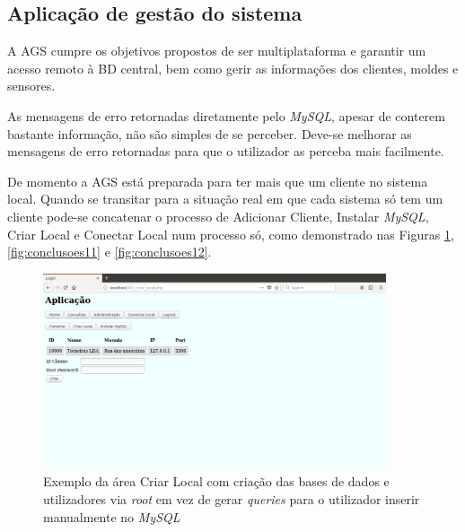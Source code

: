 \documentclass[11pt,twoside,a4paper]{report}
\begin{document}
\subsection{Aplicação de gestão do sistema}
A AGS cumpre os objetivos propostos de ser multiplataforma e garantir um acesso remoto à BD central, bem como gerir as informações dos clientes, moldes e sensores.\par
As mensagens de erro retornadas diretamente pelo \textit{MySQL}, apesar de conterem bastante informação, não são simples de se perceber. Deve-se melhorar as mensagens de erro retornadas para que o utilizador as perceba mais facilmente.\par 
De momento a AGS está preparada para ter mais que um cliente no sistema local. Quando se transitar para a situação real em que cada sistema só tem um cliente pode-se concatenar o processo de Adicionar Cliente, Instalar \textit{MySQL}, Criar Local e Conectar Local num processo só, como demonstrado nas Figuras \ref{fig:conclusoes1}, \ref{fig:conclusoes11} e \ref{fig:conclusoes12}.
\begin{figure}[H]
	\begin{center}
		\includegraphics[width=0.9\textwidth]{futuro01} %
		\caption{Exemplo da área Criar Local com criação das bases de dados e utilizadores via \textit{root} em vez de gerar \textit{queries} para o utilizador inserir manualmente no \textit{MySQL}}
		\label{fig:conclusoes1}
	\end{center}
\end{figure}
\end{document}
